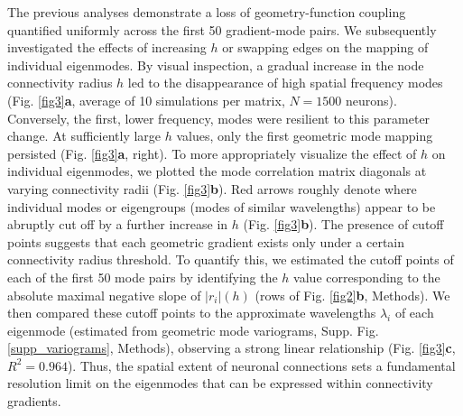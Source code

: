 \documentclass{article}
\begin{document}
The previous analyses demonstrate a loss of geometry-function coupling quantified uniformly across the first 50 gradient-mode pairs. We subsequently investigated the effects of increasing $h$ or swapping edges on the mapping of individual eigenmodes. By visual inspection, a gradual increase in the node connectivity radius $h$ led to the disappearance of high spatial frequency modes (Fig. \ref{fig3}\textbf{a}, average of 10 simulations per matrix, $N=1500$ neurons). Conversely, the first, lower frequency, modes were resilient to this parameter change. At sufficiently large $h$ values, only the first geometric mode mapping persisted (Fig. \ref{fig3}\textbf{a}, right). To more appropriately visualize the effect of $h$ on individual eigenmodes, we plotted the mode correlation matrix diagonals at varying connectivity radii (Fig. \ref{fig3}\textbf{b}). Red arrows roughly denote where individual modes or eigengroups (modes of similar wavelengths) appear to be abruptly cut off by a further increase in $h$ (Fig. \ref{fig3}\textbf{b}). The presence of cutoff points suggests that each geometric gradient exists only under a certain connectivity radius threshold. To quantify this, we estimated the cutoff points of each of the first 50 mode pairs by identifying the $h$ value corresponding to the absolute maximal negative slope of $|r_i|(h)$ (rows of Fig. \ref{fig2}\textbf{b}, Methods). We then compared these cutoff points to the approximate wavelengths $\lambda_i$ of each eigenmode (estimated from geometric mode variograms, Supp. Fig. \ref{supp_variograms}, Methods), observing a strong linear relationship (Fig. \ref{fig3}\textbf{c}, $R^2=0.964$). Thus, the spatial extent of neuronal connections sets a fundamental resolution limit on the eigenmodes that can be expressed within connectivity gradients.
\end{document}
